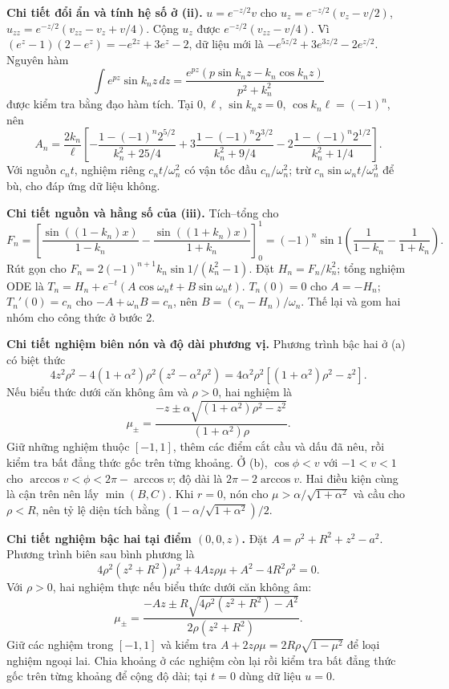\textbf{Chi tiết đổi ẩn và tính hệ số ở (ii).} $u=e^{-z/2}v$ cho $u_z=e^{-z/2}(v_z-v/2)$, $u_{zz}=e^{-z/2}(v_{zz}-v_z+v/4)$. Cộng $u_z$ được $e^{-z/2}(v_{zz}-v/4)$. Vì $(e^z-1)(2-e^z)=-e^{2z}+3e^z-2$, dữ liệu mới là $-e^{5z/2}+3e^{3z/2}-2e^{z/2}$. Nguyên hàm
\[\int e^{pz}\sin k_nz\,dz=
\frac{e^{pz}(p\sin k_nz-k_n\cos k_nz)}{p^2+k_n^2}\]
được kiểm tra bằng đạo hàm tích. Tại $0,\ell$, $\sin k_nz=0$, $\cos k_n\ell=(-1)^n$, nên
\[A_n=\frac{2k_n}{\ell}\left[
-\frac{1-(-1)^n2^{5/2}}{k_n^2+25/4}
+3\frac{1-(-1)^n2^{3/2}}{k_n^2+9/4}
-2\frac{1-(-1)^n2^{1/2}}{k_n^2+1/4}\right].\]
Với nguồn $c_nt$, nghiệm riêng $c_nt/\omega_n^2$ có vận tốc đầu $c_n/\omega_n^2$; trừ $c_n\sin\omega_nt/\omega_n^3$ để bù, cho đáp ứng dữ liệu không.

\textbf{Chi tiết nguồn và hằng số của (iii).} Tích–tổng cho
\[F_n=\left[\frac{\sin((1-k_n)x)}{1-k_n}
-\frac{\sin((1+k_n)x)}{1+k_n}\right]_0^1
=(-1)^n\sin1\left(\frac1{1-k_n}-\frac1{1+k_n}\right).\]
Rút gọn cho $F_n=2(-1)^{n+1}k_n\sin1/(k_n^2-1)$. Đặt $H_n=F_n/k_n^2$; tổng nghiệm ODE là $T_n=H_n+e^{-t}(A\cos\omega_nt+B\sin\omega_nt)$. $T_n(0)=0$ cho $A=-H_n$; $T_n'(0)=c_n$ cho $-A+\omega_nB=c_n$, nên $B=(c_n-H_n)/\omega_n$. Thế lại và gom hai nhóm cho công thức ở bước 2.

\textbf{Chi tiết nghiệm biên nón và độ dài phương vị.} Phương trình bậc hai ở (a) có biệt thức
\[4z^2\rho^2-4(1+\alpha^2)\rho^2(z^2-\alpha^2\rho^2)
=4\alpha^2\rho^2[(1+\alpha^2)\rho^2-z^2].\]
Nếu biểu thức dưới căn không âm và $\rho>0$, hai nghiệm là
\[\mu_\pm=\frac{-z\pm\alpha\sqrt{(1+\alpha^2)\rho^2-z^2}}{(1+\alpha^2)\rho}.\]
Giữ những nghiệm thuộc $[-1,1]$, thêm các điểm cắt cầu và dấu đã nêu, rồi kiểm tra bất đẳng thức gốc trên từng khoảng. Ở (b), $\cos\phi<v$ với $-1<v<1$ cho $\arccos v<\phi<2\pi-\arccos v$; độ dài là $2\pi-2\arccos v$. Hai điều kiện cùng là cận trên nên lấy $\min(B,C)$. Khi $r=0$, nón cho $\mu>\alpha/\sqrt{1+\alpha^2}$ và cầu cho $\rho<R$, nên tỷ lệ diện tích bằng $(1-\alpha/\sqrt{1+\alpha^2})/2$.

\textbf{Chi tiết nghiệm bậc hai tại điểm $(0,0,z)$.} Đặt $A=\rho^2+R^2+z^2-a^2$. Phương trình biên sau bình phương là
\[4\rho^2(z^2+R^2)\mu^2+4Az\rho\mu+A^2-4R^2\rho^2=0.\]
Với $\rho>0$, hai nghiệm thực nếu biểu thức dưới căn không âm:
\[\mu_\pm=\frac{-Az\pm R\sqrt{4\rho^2(z^2+R^2)-A^2}}{2\rho(z^2+R^2)}.\]
Giữ các nghiệm trong $[-1,1]$ và kiểm tra $A+2z\rho\mu=2R\rho\sqrt{1-\mu^2}$ để loại nghiệm ngoại lai. Chia khoảng ở các nghiệm còn lại rồi kiểm tra bất đẳng thức gốc trên từng khoảng để cộng độ dài; tại $t=0$ dùng dữ liệu $u=0$.

